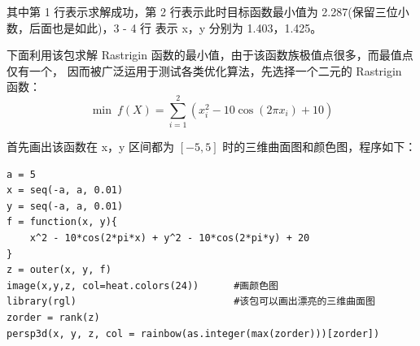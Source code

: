 其中第 1 行表示求解成功，第 2 行表示此时目标函数最小值为 2.287(保留三位小数，后面也是如此)，3 - 4 行
表示 x，y 分别为 1.403，1.425。


下面利用该包求解 Rastrigin 函数的最小值，由于该函数族极值点很多，而最值点仅有一个，
因而被广泛运用于测试各类优化算法，先选择一个二元的 Rastrigin 函数：
\[
 \min \ f(X) = \sum\limits_{i = 1}^2 {(x_i^2  - 10\cos (2\pi x_i ) + 10)}
\]

首先画出该函数在 x，y 区间都为 $[-5,5]$ 时的三维曲面图和颜色图，程序如下：
\begin{Verbatim}
a = 5
x = seq(-a, a, 0.01)
y = seq(-a, a, 0.01)
f = function(x, y){
    x^2 - 10*cos(2*pi*x) + y^2 - 10*cos(2*pi*y) + 20
}
z = outer(x, y, f)
image(x,y,z, col=heat.colors(24))      #画颜色图
library(rgl)                           #该包可以画出漂亮的三维曲面图
zorder = rank(z)
persp3d(x, y, z, col = rainbow(as.integer(max(zorder)))[zorder])
\end{Verbatim}
